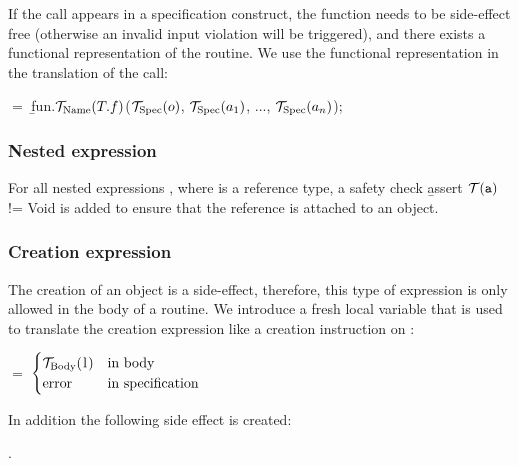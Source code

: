 If the call appears in a specification construct, the function needs to be side-effect free (otherwise an invalid input violation will be triggered), and there exists a functional representation of the routine. We use the functional representation in the translation of the call:
\begin{center}
 $=$ \b{fun.$\ts{Name}{T.f}$($\ts{Spec}{o}$, $\ts{Spec}{a_1}$, ..., $\ts{Spec}{a_n}$)};
\end{center}


\subsubsection{Nested expression}

For all nested expressions , where  is a reference type, a safety check \b{assert$\ \tr{\text{\ttfamily a}}\ $!= Void} is added to ensure that the reference  is attached to an object.

\subsubsection{Creation expression}

The creation of an object is a side-effect, therefore, this type of expression is only allowed in the body of a routine. We introduce a fresh local variable  that is used to translate the creation expression like a creation instruction on :
\begin{center}
 $=$ 
$\begin{cases}
\ts{Body}{\e{l}} & \text{in body} \\
\text{error} & \text{in specification} \\
\end{cases}$
\end{center}
In addition the following side effect is created:
\begin{center}
.
\end{center}



